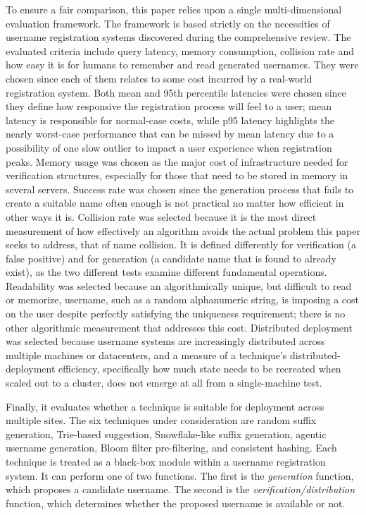 \documentclass[conference]{IEEEtran}
\begin{document}
To ensure a fair comparison, this paper relies upon a single multi-dimensional evaluation framework. The framework is based strictly on the necessities of username registration systems discovered during the comprehensive review. The evaluated criteria include query latency, memory consumption, collision rate and how easy it is for humans to remember and read generated usernames.
They were chosen since each of them relates to some cost incurred by a real-world registration system. Both mean and 95th percentile latencies were chosen since they define how responsive the registration process will feel to
a user; mean latency is responsible for normal-case costs, while
p95 latency highlights the nearly worst-case performance that
can be missed by mean latency due to a possibility of one
slow outlier to impact a user experience when registration
peaks. Memory usage was chosen as the major cost of
infrastructure needed for verification structures, especially
for those that need to be stored in memory in several
servers. Success rate was chosen since the generation
process that fails to create a suitable name often enough is
not practical no matter how efficient in other ways it is. Collision rate was selected because it is the most direct
measurement of how effectively an algorithm avoids the actual
problem this paper seeks to address, that of name collision. It is defined differently for verification
(a false positive) and for generation (a candidate name that is found
to already exist), as the two different tests examine different
fundamental operations. Readability was selected because an
algorithmically unique, but difficult to read or memorize, username, such
as a random alphanumeric string, is imposing a cost on the user despite
perfectly satisfying the uniqueness requirement; there is no other
algorithmic measurement that addresses this cost. Distributed deployment
was selected because username systems are increasingly distributed across
multiple machines or datacenters, and a measure of a technique's
distributed-deployment efficiency, specifically how much state needs to be
recreated when scaled out to a cluster, does not emerge at all from a
single-machine test.

Finally, it evaluates whether a technique is suitable for deployment across multiple sites. The six techniques under consideration are random suffix generation, Trie-based suggestion, Snowflake-like suffix generation, agentic username generation, Bloom filter pre-filtering, and consistent hashing. Each technique is treated as a black-box module within a username registration system. It can perform one of two functions. The first is the \textit{generation} function, which proposes a candidate username. The second is the \textit{verification/distribution} function, which determines whether the proposed username is available or not. 
\end{document}
